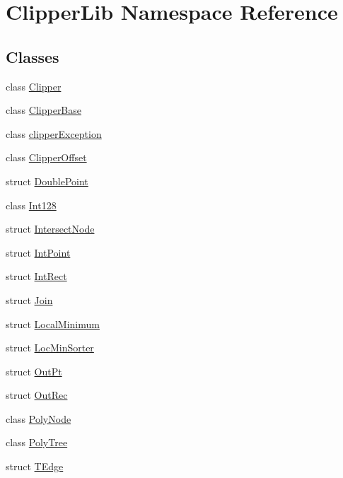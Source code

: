 \hypertarget{namespace_clipper_lib}{}\section{Clipper\+Lib Namespace Reference}
\label{namespace_clipper_lib}
\subsection*{Classes}
\begin{DoxyCompactItemize}
\item 
class \mbox{\hyperlink{class_clipper_lib_1_1_clipper}{Clipper}}
\item 
class \mbox{\hyperlink{class_clipper_lib_1_1_clipper_base}{Clipper\+Base}}
\item 
class \mbox{\hyperlink{class_clipper_lib_1_1clipper_exception}{clipper\+Exception}}
\item 
class \mbox{\hyperlink{class_clipper_lib_1_1_clipper_offset}{Clipper\+Offset}}
\item 
struct \mbox{\hyperlink{struct_clipper_lib_1_1_double_point}{Double\+Point}}
\item 
class \mbox{\hyperlink{class_clipper_lib_1_1_int128}{Int128}}
\item 
struct \mbox{\hyperlink{struct_clipper_lib_1_1_intersect_node}{Intersect\+Node}}
\item 
struct \mbox{\hyperlink{struct_clipper_lib_1_1_int_point}{Int\+Point}}
\item 
struct \mbox{\hyperlink{struct_clipper_lib_1_1_int_rect}{Int\+Rect}}
\item 
struct \mbox{\hyperlink{struct_clipper_lib_1_1_join}{Join}}
\item 
struct \mbox{\hyperlink{struct_clipper_lib_1_1_local_minimum}{Local\+Minimum}}
\item 
struct \mbox{\hyperlink{struct_clipper_lib_1_1_loc_min_sorter}{Loc\+Min\+Sorter}}
\item 
struct \mbox{\hyperlink{struct_clipper_lib_1_1_out_pt}{Out\+Pt}}
\item 
struct \mbox{\hyperlink{struct_clipper_lib_1_1_out_rec}{Out\+Rec}}
\item 
class \mbox{\hyperlink{class_clipper_lib_1_1_poly_node}{Poly\+Node}}
\item 
class \mbox{\hyperlink{class_clipper_lib_1_1_poly_tree}{Poly\+Tree}}
\item 
struct \mbox{\hyperlink{struct_clipper_lib_1_1_t_edge}{T\+Edge}}
\end{DoxyCompactItemize}
